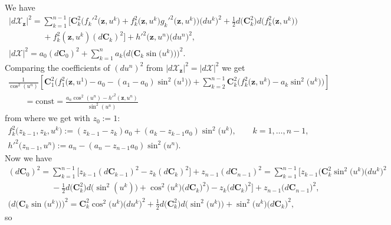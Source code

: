 We have
\begin{gather*}
|d\mathcal{X}_{\mathbf{z}}|^2=\sum_{k=1}^{n-1}\big[\mathbf{C}_k^2\big(f_k'^2\big(\mathbf{z},u^k\big)
+f_k^2\big(\mathbf{z},u^k\big)g_k'^2\big(\mathbf{z},u^k\big)\big)\big(du^k\big)^2
+\tfrac{1}{2}d\big(\mathbf{C}_k^2\big)d\big(f_k^2\big(\mathbf{z},u^k\big)\big)
\\
\phantom{|d\mathcal{X}_{\mathbf{z}}|^2=}{}
+f_k^2(\mathbf{z},u^k)(d\mathbf{C}_k)^2\big]
+h'^2\big(\mathbf{z},u^n\big)\big(du^n\big)^2,\\
|d\mathcal{X}|^2=a_0(d\mathbf{C}_0)^2
+\sum_{k=1}^na_k\big(d\big(\mathbf{C}_k\sin\big(u^k\big)\big)\big)^2.
\end{gather*}
Comparing the coef\/f\/icients of $(du^n)^2$ from
$|d\mathcal{X}_{\mathbf{z}}|^2=|d\mathcal{X}|^2$ we get
\begin{gather*}
\frac{1}{\cos^2(u^n)}\left[\mathbf{C}_1^2\big(f_1^2\big(\mathbf{z},u^1\big)-a_0-(a_1-a_0)\sin^2\big(u^1\big)\big)+
\sum_{k=2}^{n-1}\mathbf{C}_k^2\big(f_k^2\big(\mathbf{z},u^k\big)-a_k\sin^2\big(u^k\big)\big)\right]
\\
\qquad {}=\mathrm{const}=\frac{a_n\cos^2(u^n)-h'^2(\mathbf{z},u^n)}{\sin^2(u^n)}
\end{gather*}
from where we get with $z_0:=1$:
\begin{gather*}
f_k^2\big(z_{k-1},z_k,u^k\big):=(z_{k-1}-z_k)a_0+(a_k-z_{k-1}a_0)\sin^2\big(u^k\big),\qquad
k=1,\dots ,n-1,
\\
h'^2\big(z_{n-1},u^n\big):=a_n-(a_n-z_{n-1}a_0)\sin^2\big(u^n\big).
\end{gather*}
Now we have
\begin{gather*}
(d\mathbf{C}_0)^2=\sum_{k=1}^{n-1}\big[z_{k-1}(d\mathbf{C}_{k-1})^2-z_k(d\mathbf{C}_k)^2\big]
+z_{n-1}(d\mathbf{C}_{n-1})^2=\sum_{k=1}^{n-1}\!\big[z_{k-1} \big(\mathbf{C}_k^2\sin^2\big(u^k\big)\big(du^k\big)^2
\\
\phantom{(d\mathbf{C}_0)^2=}{}
-\tfrac{1}{2}d\big(\mathbf{C}_k^2\big)d\big(\sin^2(u^k)\big)+\cos^2\big(u^k\big)\big(d\mathbf{C}_k\big)^2\big)
-z_k\big(d\mathbf{C}_k\big)^2\big] +z_{n-1}\big(d\mathbf{C}_{n-1}\big)^2,
\\
\big(d\big(\mathbf{C}_k\sin\big(u^k\big)\big)\big)^2=\mathbf{C}_k^2\cos^2\big(u^k\big)\big(du^k\big)^2
+\tfrac{1}{2}d\big(\mathbf{C}_k^2\big)d\big(\sin^2\big(u^k\big)\big)+\sin^2\big(u^k\big)\big(d\mathbf{C}_k\big)^2,
\end{gather*}
so
